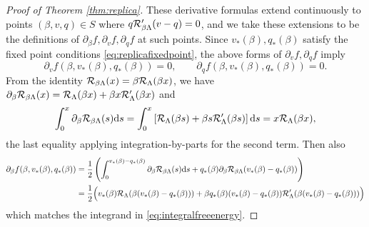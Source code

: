 \begin{proof}[Proof of Theorem \ref{thm:replica}]
These derivative formulas extend continuously to points $(\beta,v,q) \in S$ where
$q\mathcal{R}_{\beta\Lambda}'(v-q)=0$, and we take these extensions to be the
definitions of $\partial_\beta f,\partial_v f,\partial_q f$ at such points.
Since $v_*(\beta),q_*(\beta)$ satisfy the fixed point
conditions \eqref{eq:replicafixedpoint}, the above forms of $\partial_v
f,\partial_q f$ imply
\begin{equation}\label{eq:vqderivvanish}
\partial_v f(\beta,v_*(\beta),q_*(\beta))=0,
\qquad \partial_q f(\beta,v_*(\beta),q_*(\beta))=0.
\end{equation}
From the identity $\mathcal{R}_{\beta\Lambda}(x)=\beta\mathcal{R}_\Lambda(\beta x)$, we have
$\partial_\beta \mathcal{R}_{\beta\Lambda}(x)=\mathcal{R}_{\Lambda}(\beta x)+\beta
x\mathcal{R}_\Lambda'(\beta x)$ and
\[\int_0^x \partial_\beta \mathcal{R}_{\beta\Lambda}(s) \mathrm{d}  s
=\int_0^x \left[\mathcal{R}_\Lambda(\beta s)+\beta s\mathcal{R}_\Lambda'(\beta s)
\right]\mathrm{d} s=x\mathcal{R}_\Lambda(\beta x),\]
the last equality applying integration-by-parts for the second term. Then also
\begin{align*}
\partial_\beta f(\beta,v_*(\beta),q_*(\beta))
&=\frac{1}{2}\left(\int_0^{v_*(\beta)-q_*(\beta)}
\partial_\beta \mathcal{R}_{\beta\Lambda}(s) \mathrm{d} s
+q_*(\beta)\partial_\beta
\mathcal{R}_{\beta\Lambda}(v_*(\beta)-q_*(\beta))\right)\\
&=\frac{1}{2}\Big(v_*(\beta)\mathcal{R}_\Lambda(\beta(v_*(\beta)-q_*(\beta)))
+\beta q_*(\beta)(v_*(\beta)-q_*(\beta))
\mathcal{R}_\Lambda'(\beta(v_*(\beta)-q_*(\beta)))\Big)
\end{align*}
which matches the integrand in \eqref{eq:integralfreeenergy}.


\end{proof}
